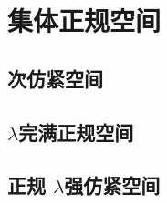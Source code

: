 \documentclass[main.tex]{subfiles}
\begin{document}
	
	
\chapter{集体正规空间}\label{ch8}
	
	\section{次仿紧空间}\label{sec:4.1}
	
	
	\section{$\lambda$完满正规空间}\label{sec:4.2}
	
	
	\section{正规	$\lambda$强仿紧空间}\label{sec:4.3}
	
\end{document}
